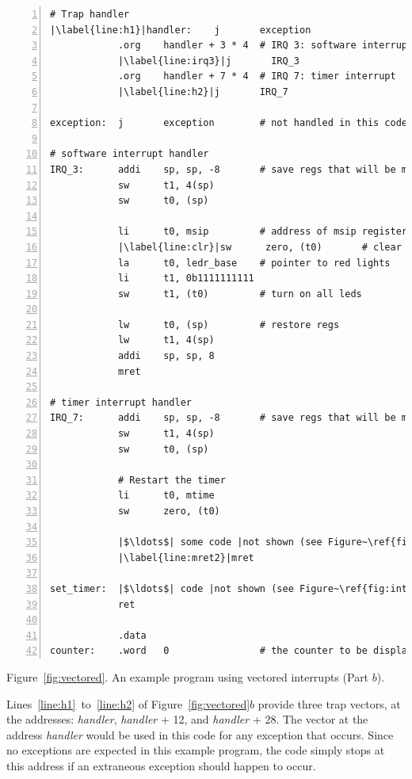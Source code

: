 \documentclass[11pt, twoside, pdftex]{article}
\begin{document}
\begin{center}
\begin{minipage}[h]{15 cm}
\begin{lstlisting}[style=defaultNiosVStyle, name=vecs, numbers=left, escapechar=|]
# Trap handler
|\label{line:h1}|handler:    j       exception
            .org    handler + 3 * 4  # IRQ 3: software interrupt
            |\label{line:irq3}|j       IRQ_3
            .org    handler + 7 * 4  # IRQ 7: timer interrupt
            |\label{line:h2}|j       IRQ_7

exception:  j       exception        # not handled in this code
            
# software interrupt handler
IRQ_3:      addi    sp, sp, -8       # save regs that will be modified
            sw      t1, 4(sp)
            sw      t0, (sp)

            li      t0, msip         # address of msip register
            |\label{line:clr}|sw      zero, (t0)       # clear software interrupt
            la      t0, ledr_base    # pointer to red lights
            li      t1, 0b1111111111
            sw      t1, (t0)         # turn on all leds

            lw      t0, (sp)         # restore regs
            lw      t1, 4(sp)
            addi    sp, sp, 8
            mret

# timer interrupt handler
IRQ_7:      addi    sp, sp, -8       # save regs that will be modified
            sw      t1, 4(sp)
            sw      t0, (sp)
            
            # Restart the timer
            li      t0, mtime
            sw      zero, (t0)

            |$\ldots$| some code |not shown (see Figure~\ref{fig:ints})|
            |\label{line:mret2}|mret

set_timer:  |$\ldots$| code |not shown (see Figure~\ref{fig:ints})|
            ret

            .data
counter:    .word   0                # the counter to be displayed
\end{lstlisting}

\vspace{0.25in}
Figure~\ref{fig:vectored}.	An example program using vectored interrupts (Part $b$).
\end{minipage}
\end{center}

Lines~\ref{line:h1}~to~\ref{line:h2} of Figure~\ref{fig:vectored}$b$ provide three
trap vectors, at the addresses: {\it handler}, {\it handler} + 12, and {\it handler} + 28.
The vector at the address {\it handler} would be used in this code for any exception that
occurs. Since no exceptions are expected in this example program, the code simply stops at
this address if an extraneous exception should happen to occur. 
\end{document}
